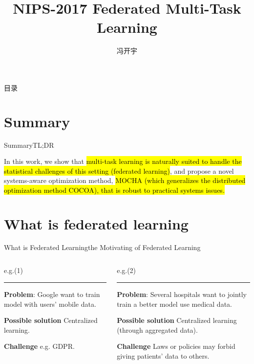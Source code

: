 \documentclass[UTF8,aspectratio=169,presentation]{ctexbeamer}
\makeatletter
\let\HL\hl
\renewcommand\hl{%
  \let\set@color\beamerorig@set@color
  \let\reset@color\beamerorig@reset@color
  \HL}
\makeatother
\begin{document}
\title{NIPS-2017 Federated Multi-Task Learning}
\author{冯开宇}
\date{\zhtoday}
\frame{\titlepage}

%
\begin{frame}{目录}
  \tableofcontents[hideallsubsections]
\end{frame}

%
\section{Summary}    %


\begin{frame}{Summary}{TL;DR}

  In this work, we show that \hl{multi-task learning is naturally suited to handle the statistical challenges of this setting (federated learning)}, and propose a novel systems-aware optimization method, \hl{MOCHA (which generalizes the distributed optimization method COCOA), that is robust to practical systems issues.}

\end{frame}

\section{What is federated learning}    %

\newcommand{\eg}{e.g.\@\xspace}

\begin{frame}{What is Federated Learning}{the Motivating of Federated Learning}
\begin{columns}[T] %
\begin{column}{.48\textwidth}
\color{red}
\eg (1)
\rule{\linewidth}{4pt}
\color{black}


\textbf{Problem}: Google want to train model with users' mobile data.

\textbf{Possible solution} Centralized learning.

\textbf{Challenge} \eg GDPR.


\end{column}%
\hfill%
\begin{column}{.48\textwidth}
\color{blue}
\eg (2)
\rule{\linewidth}{4pt}
\color{black}

\textbf{Problem}: Several hospitals want to jointly train a better model use medical data.

\textbf{Possible solution} Centralized learning (through aggregated data).

\textbf{Challenge} Laws or policies may forbid giving patients' data to others.
\end{column}%
\end{columns}


\end{frame}
\end{document}
